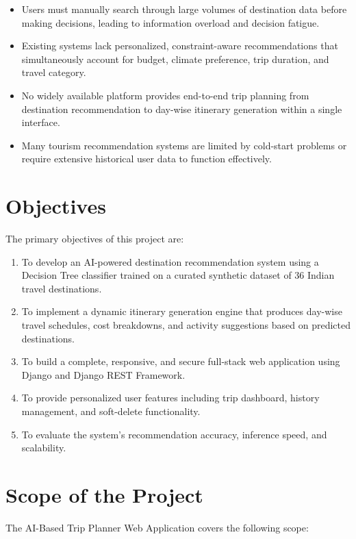 \begin{itemize}
    \item Users must manually search through large volumes of destination data before making decisions, leading to information overload and decision fatigue.
    \item Existing systems lack personalized, constraint-aware recommendations that simultaneously account for budget, climate preference, trip duration, and travel category.
    \item No widely available platform provides end-to-end trip planning from destination recommendation to day-wise itinerary generation within a single interface.
    \item Many tourism recommendation systems are limited by cold-start problems or require extensive historical user data to function effectively.
\end{itemize}

\section{Objectives}

The primary objectives of this project are:

\begin{enumerate}
    \item To develop an AI-powered destination recommendation system using a Decision Tree classifier trained on a curated synthetic dataset of 36 Indian travel destinations.
    \item To implement a dynamic itinerary generation engine that produces day-wise travel schedules, cost breakdowns, and activity suggestions based on predicted destinations.
    \item To build a complete, responsive, and secure full-stack web application using Django and Django REST Framework.
    \item To provide personalized user features including trip dashboard, history management, and soft-delete functionality.
    \item To evaluate the system's recommendation accuracy, inference speed, and scalability.
\end{enumerate}

\section{Scope of the Project}

The AI-Based Trip Planner Web Application covers the following scope:

